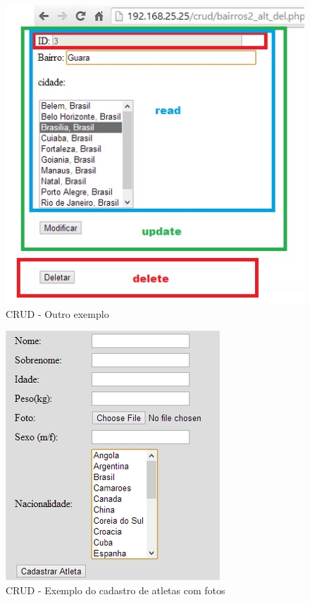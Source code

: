 \documentclass[10pt]{article}
\begin{document}
\begin{center}
\begin{figure}[h!]
\includegraphics[scale=0.8]{crud3-bairros-altdel.jpg}
\caption{CRUD - Outro exemplo}
\end{figure}
\end{center}

\begin{center}
\begin{figure}[h!]
\includegraphics[scale=0.7]{crud5-atletas.jpg}
\caption{CRUD - Exemplo do cadastro de atletas com fotos}
\end{figure}
\end{center}
\end{document}
